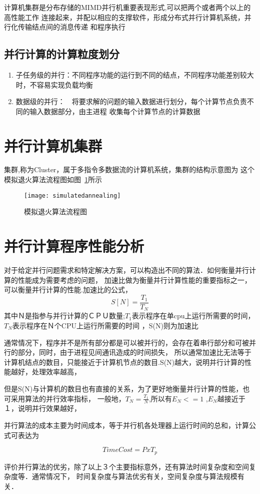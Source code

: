     计算机集群是分布存储的MIMD并行机重要表现形式,可以把两个或者两个以上的高性能工作
连接起来，并配以相应的支撑软件，形成分布式并行计算机系统，并行化传输结点间的消息传递
和程序执行


\subsection{并行计算的计算粒度划分}     
    \begin{enumerate}
    \item 子任务级的并行：不同程序功能的运行到不同的结点，不同程序功能差别较大时，不容易实现负载均衡
    \item 数据级的并行：　将要求解的问题的输入数据进行划分，每个计算节点负责不同的输入数据部分，由主进程
收集每个计算节点的计算数据
    \end{enumerate}

\section{并行计算机集群}
    集群,称为Cluster，属于多指令多数据流的计算机系统，集群的结构示意图为
   这个模拟退火算法流程图如图~\ref{fig:simulatedannealing}所示

    \begin{figure}[htbp]
    \centering
    \texttt{[image: simulatedannealing]}
    \caption{模拟退火算法流程图}\label{fig:simulatedannealing}
    \vspace{\baselineskip}
    \end{figure}

    

\section{并行计算程序性能分析}
    对于给定并行问题需求和特定解决方案，可以构造出不同的算法．如何衡量并行计算的性能成为需要考虑的问题，
加速比做为衡量并行计算性能的重要指标之一，可以衡量并行计算的性能.加速比的公式，
    \[  S[N] = \frac{T_1}{T_N}  \]
其中Ｎ是指参与并行计算的ＣＰＵ数量;$T_1$表示程序在单cpu上运行所需要的时间，$T_N$表示程序在Ｎ个CPU上运行所需要的时间
，S(N)则为加速比
    
    通常情况下，程序并不是所有部分都是可以被并行的，会存在着串行部分和可被并行的部分，同时，由于进程见间通讯造成的时间损失，
所以通常加速比无法等于计算机结点的数目，只能接近于计算机节点的数目.S(N)越大，说明并行计算的性能越好，处理效率越高，

    但是S(N)与计算机的数目也有直接的关系，为了更好地衡量并行计算的性能，也可采用算法的并行效率指标，
一般地，$T_N = \frac{T_1}{N}$,所以有$E_N <= 1 $ ,$E_N$越接近于１，说明并行效果越好，

    并行算法的成本主要为时间成本，等于并行机各处理器上运行时间的总和，计算公式可表达为
    
    \[ TimeCost=PxT_p  \]

    评价并行算法的优劣，除了以上３个主要指标意外，还有算法时间复杂度和空间复杂度等．通常情况下，
时间复杂度与算法优劣有关，空间复杂度与算法规模有关．
